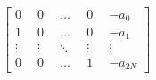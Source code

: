 \footnotesize{
\(
\left[\begin{matrix}
    0 \enspace & 0 \enspace & \dots \enspace & 0 \enspace & -a_{0}\\
    1 \enspace & 0 \enspace & \dots \enspace & 0 \enspace & -a_{1} \\
    \vdots \enspace & \vdots \enspace & \ddots \enspace & \vdots  \enspace & \vdots \\
    0 \enspace & 0 \enspace &  \dots  \enspace & 1 \enspace & -a_{2N}
\end{matrix}\right]
\)
}